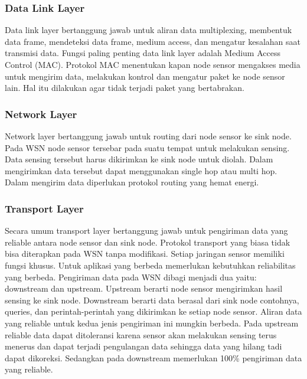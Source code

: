 \subsubsection{Data Link Layer}
Data link layer bertanggung jawab untuk aliran data multiplexing, membentuk data frame, mendeteksi data frame, medium access, dan mengatur kesalahan saat transmisi data. Fungsi paling penting data link layer adalah Medium Access Control (MAC). Protokol MAC menentukan kapan node sensor mengakses media untuk mengirim data, melakukan kontrol dan mengatur paket ke node sensor lain. Hal itu dilakukan agar tidak terjadi paket yang bertabrakan. 

\subsubsection{Network Layer}
Network layer bertanggung jawab untuk routing dari node sensor ke sink node. Pada WSN node sensor tersebar pada suatu tempat untuk melakukan sensing. Data sensing tersebut harus dikirimkan ke sink node untuk diolah. Dalam mengirimkan data tersebut dapat menggunakan single hop atau multi hop. Dalam mengirim data diperlukan protokol routing yang hemat energi.

\subsubsection{Transport Layer}
Secara umum transport layer bertanggung jawab untuk pengiriman data yang reliable antara node sensor dan sink node. Protokol transport yang biasa tidak bisa diterapkan pada WSN tanpa modifikasi. Setiap jaringan sensor memiliki fungsi khusus. Untuk aplikasi yang berbeda memerlukan kebutuhkan reliabilitas yang berbeda. Pengiriman data pada WSN dibagi menjadi dua yaitu: downstream dan upstream. Upstream berarti node sensor mengirimkan hasil sensing ke sink node. Downstream berarti data berasal dari sink node contohnya, queries, dan perintah-perintah yang dikirimkan ke setiap node sensor. Aliran data yang reliable untuk kedua jenis pengiriman ini mungkin berbeda. Pada upstream reliable data dapat ditoleransi karena sensor akan melakukan sensing terus menerus dan dapat terjadi pengulangan data sehingga data yang hilang tadi dapat dikoreksi. Sedangkan pada downstream memerlukan 100\% pengiriman data yang reliable. 


